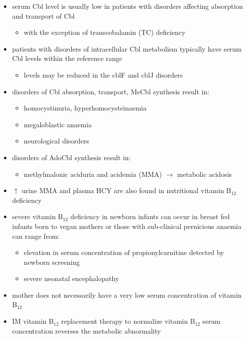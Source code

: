 \documentclass{scrartcl}
\begin{document}
\begin{itemize}
\item serum Cbl level is usually low in patients with disorders affecting
absorption and transport of Cbl
\begin{itemize}
\item with the exception of transcobalamin (TC) deficiency
\end{itemize}
\item patients with disorders of intracellular Cbl metabolism typically
have serum Cbl levels within the reference range
\begin{itemize}
\item levels may be reduced in the cblF and cblJ disorders
\end{itemize}
\item disorders of Cbl absorption, transport, MeCbl synthesis result in:
\begin{itemize}
\item homocystinuria, hyperhomocysteinaemia
\item megaloblastic anaemia
\item neurological disorders
\end{itemize}
\item disorders of AdoCbl synthesis result in:
\begin{itemize}
\item methylmalonic aciduria and acidemia (MMA) \(\to\) metabolic
acidosis
\end{itemize}
\item \(\uparrow\) urine MMA and plasma HCY are also found in nutritional
vitamin B\(_{\text{12}}\) deficiency
\item severe vitamin B\(_{\text{12}}\) deficiency in newborn infants can occur in
breast fed infants born to vegan mothers or those with sub-clinical
pernicious anaemia can range from:
\begin{itemize}
\item elevation in serum concentration of propionylcarnitine detected by
newborn screening
\item severe neonatal encephalopathy
\end{itemize}
\item mother does not necessarily have a very low serum concentration of
vitamin B\(_{\text{12}}\)
\item IM vitamin B\(_{\text{12}}\) replacement therapy to normalize vitamin B\(_{\text{12}}\) serum
concentration reverses the metabolic abnormality
\end{itemize}
\end{document}
